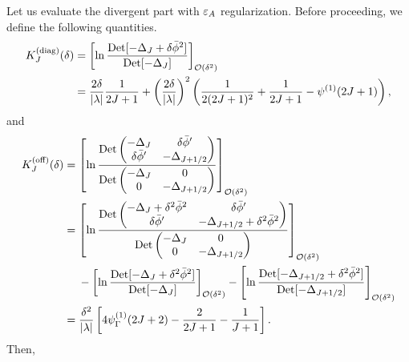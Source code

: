 \documentclass[12pt]{article}
\begin{document}
Let us evaluate the divergent part with $\eps{A}$ regularization.
Before proceeding, we define the following quantities.
\begin{align}
 K_J^{\rm (diag)}(\delta)
  & = \left[
  \ln\frac{\det[-\Delta_J+\delta\bar\phi^2]}{\det[-\Delta_J]}
 \right]_{\mathcal O(\delta^2)}
 \\
  & = \frac{2\delta}{|\lambda|}\frac{1}{2J+1}+
 \left(
  \frac{2\delta}{|\lambda|}
 \right)^2
 \left(
  \frac{1}{2(2J+1)^2}+\frac{1}{2J+1}-\psi^{(1)}(2J+1)
 \right),
\end{align}
and
\begin{align}
 K_J^{\rm (off)}(\delta)
  & =
 \left[
  \ln\frac{\det
   \begin{pmatrix}
    -\Delta_J
     & \delta\bar\phi' \\
    \delta\bar\phi'
     & -\Delta_{J+1/2}
   \end{pmatrix}}{\det
   \begin{pmatrix}
    -\Delta_J
     & 0               \\
    0
     & -\Delta_{J+1/2}
   \end{pmatrix}}
 \right]_{\mathcal O(\delta^2)}\nonumber \\
  & =
 \left[
  \ln\frac{\det
   \begin{pmatrix}
    -\Delta_J+\delta^2\bar\phi^2
     & \delta\bar\phi'                    \\
    \delta\bar\phi'
     & -\Delta_{J+1/2}+\delta^2\bar\phi^2
   \end{pmatrix}}{\det
   \begin{pmatrix}
    -\Delta_J
     & 0               \\
    0
     & -\Delta_{J+1/2}
   \end{pmatrix}}
 \right]_{\mathcal O(\delta^2)}\nonumber \\
  & \hspace{3ex}-
 \left[
  \ln\frac{\det[-\Delta_J+\delta^2\bar\phi^2]}{\det[-\Delta_J]}
 \right]_{\mathcal O(\delta^2)}-
 \left[
  \ln\frac{\det[-\Delta_{J+1/2}+\delta^2\bar\phi^2]}{\det[-\Delta_{J+1/2}]}
 \right]_{\mathcal O(\delta^2)}\nonumber \\
  & = \frac{\delta^2}{|\lambda|}
 \left[
  4\psi_\Gamma^{(1)}(2J+2)-\frac{2}{2J+1}-\frac{1}{J+1}
 \right].
\end{align}
Then,
\end{document}
